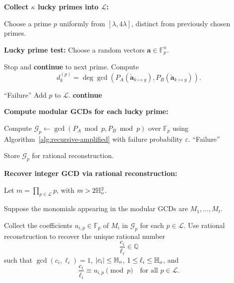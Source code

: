 \documentclass{article}
\numberwithin{equation}{section}
\begin{document}
\begin{algorithm}[p]
\begin{algorithmic}[1]

\Statex \textbf{Collect $\kappa$ lucky primes into $\mathcal{L}$:}

    \State Choose a prime $p$ uniformly from $[\lambda, 4\lambda]$, distinct from previously chosen primes.

    \Statex \textbf{Lucky prime test:}
    \State Choose a random vectors $\mathbf{a} \in \mathbb{F}_p^n$.

    
                \State Stop and \textbf{continue} to next prime.
            \EndIf
            \State Compute
            \[
            d_{k}^{(p)} = \deg \gcd(P_A(\mathbf{\check{a}}_{k \mapsto y} ), P_B(\mathbf{\check{a}}_{k \mapsto y} )).
            \]
    
    \EndFor


        \State \Return ``Failure''
        \State Add $p$ to $\mathcal{L}$. 
    \Else
        \State \textbf{continue} 
    \EndIf
\EndWhile

\Statex \textbf{Compute modular GCDs for each lucky prime:}

    \State Compute $\mathcal{G}_p \gets \gcd(P_A \bmod p, P_B \bmod p)$ over $\mathbb{F}_p$ using Algorithm~\ref{alg:recursive-amplified} with failure probability $\varepsilon$.
        \State \Return ``Failure''
    \EndIf
    
    \State Store $\mathcal{G}_{p}$ for rational reconstruction.
\EndFor

\Statex \textbf{Recover integer GCD via rational reconstruction:}

\State Let $m = \prod_{p \in \mathcal{L}} p$, with $m > 2 \mathbb{H}_{o}^2$.

\State Suppose the monomials appearing in the modular GCDs are $M_1, \dots, M_t$.

    \State Collect the coefficients $u_{i,p} \in \mathbb{F}_p$ of $M_i$ in $\mathcal{G}_p$ for each $p \in \mathcal{L}$.
    \State Use rational reconstruction to recover the unique rational number
    \[
    \frac{c_i}{\ell_i} \in \mathbb{Q}
    \]
    such that  $\gcd(c_i, \ell_i) = 1$, $|c_i| \le \mathbb{H}_{o}$, $1 \le \ell_i \le \mathbb{H}_{o}$, and
    \[
    \frac{c_i}{\ell_i} \equiv u_{i,p} \pmod{p} \quad \text{for all } p \in \mathcal{L}.
    \]
\EndFor


\end{algorithmic}
\end{algorithm}
\end{document}
